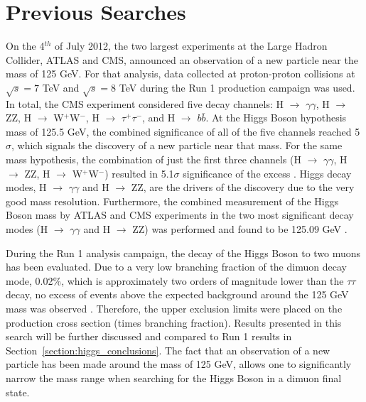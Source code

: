 \section{Previous Searches} \label{section:higgs_run1results}
On the 4$^{th}$ of July 2012, the two largest experiments at the Large Hadron Collider, ATLAS and CMS, announced an observation of a new particle near the mass of 125 GeV. For that analysis, data collected at proton-proton collisions at $\sqrt{s} = 7$ TeV and $\sqrt{s} = 8$ TeV during the Run 1 production campaign was used. In total, the CMS experiment considered five decay channels: H $\rightarrow$ $\gamma\gamma$, H $\rightarrow$ ZZ, H $\rightarrow$ W$^{+}$W$^{-}$, H $\rightarrow$ $\tau^{+}\tau^{-}$, and H $\rightarrow$ $b\bar{b}$. At the Higgs Boson hypothesis mass of 125.5 GeV, the combined significance of all of the five channels reached 5$\sigma$, which signals the discovery of a new particle near that mass. For the same mass hypothesis, the combination of just the first three channels (H $\rightarrow$ $\gamma\gamma$, H $\rightarrow$ ZZ, H $\rightarrow$ W$^{+}$W$^{-}$) resulted in 5.1$\sigma$ significance of the excess \cite{CMSHiggsRun1Observation}. Higgs decay modes, H $\rightarrow$ $\gamma\gamma$ and H $\rightarrow$ ZZ, are the drivers of the discovery due to the very good mass resolution. Furthermore, the combined measurement of the Higgs Boson mass by ATLAS and CMS experiments in the two most significant decay modes (H $\rightarrow$ $\gamma\gamma$ and H $\rightarrow$ ZZ) was performed and found to be 125.09 GeV \cite{Aad:2015zhl}.

During the Run 1 analysis campaign, the decay of the Higgs Boson to two muons has been evaluated. Due to a very low branching fraction of the dimuon decay mode, 0.02\%, which is approximately two orders of magnitude lower than the $\tau\tau$ decay, no excess of events above the expected background around the 125 GeV mass was observed \cite{CMSHiggsRunI}. Therefore, the upper exclusion limits were placed on the production cross section (times branching fraction). Results presented in this search will be further discussed and compared to Run 1 results in Section~\ref{section:higgs_conclusions}. The fact that an observation of a new particle has been made around the mass of 125 GeV, allows one to significantly narrow the mass range when searching for the Higgs Boson in a dimuon final state.

